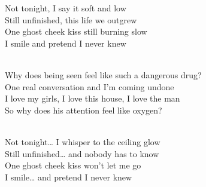 \begin{lyrics}
Not tonight, I say it soft and low\\
Still unfinished, this life we outgrew\\
One ghost cheek kiss still burning slow\\
I smile and pretend I never knew

\\
Why does being seen feel like such a dangerous drug?\\
One real conversation and I’m coming undone\\
I love my girls, I love this house, I love the man\\
So why does his attention feel like oxygen?

\\
Not tonight… I whisper to the ceiling glow\\
Still unfinished… and nobody has to know\\
One ghost cheek kiss won’t let me go\\
I smile… and pretend I never knew

\end{lyrics}

